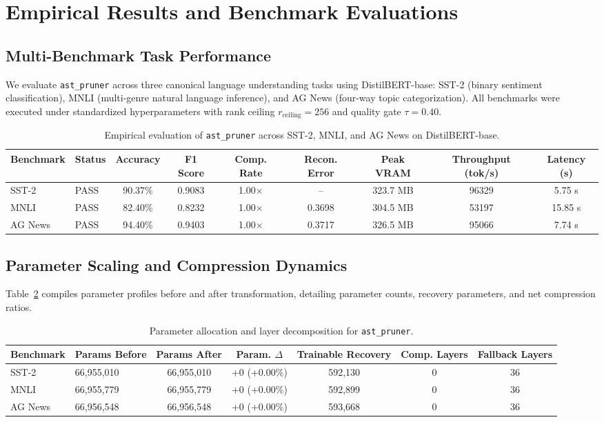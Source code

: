 \section{Empirical Results and Benchmark Evaluations}
\label{sec:results}

\subsection{Multi-Benchmark Task Performance}
We evaluate \texttt{ast\_pruner} across three canonical language understanding tasks using DistilBERT-base: SST-2 (binary sentiment classification), MNLI (multi-genre natural language inference), and AG News (four-way topic categorization). All benchmarks were executed under standardized hyperparameters with rank ceiling $r_{\mathrm{ceiling}} = 256$ and quality gate $\tau = 0.40$.

\begin{table}[t]
\centering
\small
\begin{tabular}{llccccccc}
\toprule
\textbf{Benchmark} & \textbf{Status} & \textbf{Accuracy} & \textbf{F1 Score} & \textbf{Comp. Rate} & \textbf{Recon. Error} & \textbf{Peak VRAM} & \textbf{Throughput (tok/s)} & \textbf{Latency (s)} \\
\midrule
SST-2 & PASS & 90.37\% & 0.9083 & 1.00$\times$ & -- & 323.7 MB & 96329 & 5.75 s \\
MNLI & PASS & 82.40\% & 0.8232 & 1.00$\times$ & 0.3698 & 304.5 MB & 53197 & 15.85 s \\
AG News & PASS & 94.40\% & 0.9403 & 1.00$\times$ & 0.3717 & 326.5 MB & 95066 & 7.74 s \\
\bottomrule
\end{tabular}
\caption{Empirical evaluation of \texttt{ast\_pruner} across SST-2, MNLI, and AG News on DistilBERT-base.}
\label{tab:results\_ast\_pruner}
\end{table}

\subsection{Parameter Scaling and Compression Dynamics}
Table~\ref{tab:params\_ast\_pruner} compiles parameter profiles before and after transformation, detailing parameter counts, recovery parameters, and net compression ratios.

\begin{table}[t]
\centering
\small
\begin{tabular}{llccccc}
\toprule
\textbf{Benchmark} & \textbf{Params Before} & \textbf{Params After} & \textbf{Param. $\Delta$} & \textbf{Trainable Recovery} & \textbf{Comp. Layers} & \textbf{Fallback Layers} \\
\midrule
SST-2 & 66,955,010 & 66,955,010 & +0 (+0.00\%) & 592,130 & 0 & 36 \\
MNLI & 66,955,779 & 66,955,779 & +0 (+0.00\%) & 592,899 & 0 & 36 \\
AG News & 66,956,548 & 66,956,548 & +0 (+0.00\%) & 593,668 & 0 & 36 \\
\bottomrule
\end{tabular}
\caption{Parameter allocation and layer decomposition for \texttt{ast\_pruner}.}
\label{tab:params\_ast\_pruner}
\end{table}

